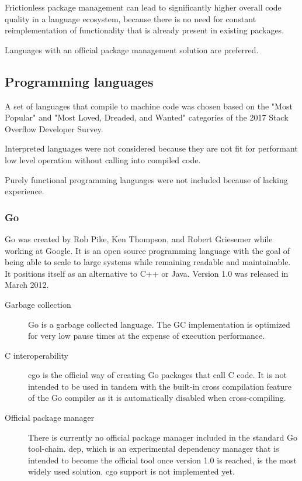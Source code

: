 Frictionless package management can lead to significantly higher overall code quality in a language ecosystem, because there is no need for constant reimplementation of functionality that is already present in existing packages. 

Languages with an official package management solution are preferred.

\subsection{Programming languages} %
A set of languages that compile to machine code was chosen based on the "Most Popular" and "Most Loved, Dreaded, and Wanted" categories of the 2017 Stack Overflow Developer Survey.

Interpreted languages were not considered because they are not fit for performant low level operation without calling into compiled code.

Purely functional programming languages were not included because of lacking experience.

\subsubsection{Go}
Go was created by Rob Pike, Ken Thompson, and Robert Griesemer while working at Google. It is an open source programming language with the goal of being able to scale to large systems while remaining readable and maintainable. It positions itself as an alternative to C++ or Java. 
Version 1.0 was released in March 2012.
\begin{description} 
\item [Garbage collection]
Go is a garbage collected language. The GC implementation is optimized for very low pause times at the expense of execution performance. 
\item [C interoperability] %
cgo is the official way of creating Go packages that call C code. It is not intended to be used in tandem with the built-in cross compilation feature of the Go compiler as it is automatically disabled when cross-compiling.
\item [Official package manager] %
There is currently no official package manager included in the standard Go tool-chain. dep, which is an experimental dependency manager that is intended to become the official tool once version 1.0 is reached, is the most widely used solution. cgo support is not implemented yet.
\end{description}


